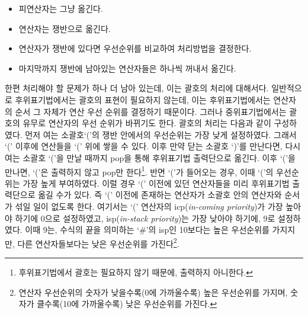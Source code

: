 \documentclass{article}
\begin{document}
\begin{itemize}
    \item 피연산자는 그냥 옮긴다.
    \item 연산자는 쟁반으로 옮긴다.
    \item 연산자가 쟁반에 있다면 우선순위를 비교하여 처리방법을 결정한다.
    \item 마지막까지 쟁반에 남아있는 연산자들은 하나씩 꺼내서 옮긴다.
\end{itemize}
한편 처리해야 할 문제가 하나 더 남아 있는데, 이는 괄호의 처리에 대해서다. 일반적으로 후위표기법에서는 괄호의 표현이 필요하지 않는데, 이는 후위표기법에서는 연산자의 순서 그 자체가 연산 우선 순위를 결정하기 때문이다. 그러나 중위표기법에서는 괄호의 유무로 연산자의 우선 순위가 바뀌기도 한다. 괄호의 처리는 다음과 같이 구성하였다. 먼저 여는 소괄호`('의 쟁반 안에서의 우선순위는 가장 낮게 설정하였다. 그래서 `(' 이후에 연산들을 `(' 위에 쌓을 수 있다. 이후 만약 닫는 소괄호 `)'를 만난다면, 다시 여는 소괄호 `('을 만날 때까지 pop을 통해 후위표기법 출력단으로 옮긴다. 이후 `('을 만나면, `('은 출력하지 않고 pop만 한다\footnote{후위표기법에서 괄호는 필요하지 않기 때문에, 출력하지 아니한다.}. 반면 `('가 들어오는 경우, 이때 `('의 우선순위는 가장 높게 부여하였다. 이럴 경우 `(' 이전에 있던 연산자들을 미리 후위표기법 출력단으로 옮길 수가 있다. 즉 `(' 이전에 존재하는 연산자가 소괄호 안의 연산자와 순서가 섞일 일이 없도록 한다. 여기서는 `(' 연산자의 icp(\textit{in-coming priority})가 가장 높아야 하기에 0으로 설정하였고, isp(\textit{in-stack priority})는 가장 낮아야 하기에, 9로 설정하였다. 이때 9는, 수식의 끝을 의미하는 `\#'의 isp인 10보다는 높은 우선순위를 가지지만, 다른 연산자들보다는 낮은 우선순위를 가진다\footnote{연산자 우선순위의 숫자가 낮을수록(0에 가까울수록) 높은 우선순위를 가지며, 숫자가 클수록(10에 가까울수록) 낮은 우선순위를 가진다.}.
\end{document}

